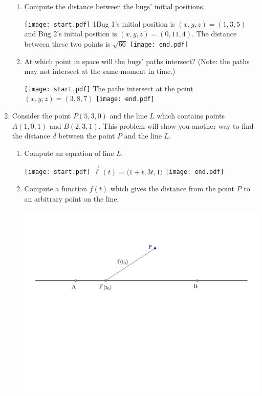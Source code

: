 \documentclass[12pt]{article}
\begin{document}
\begin{enumerate}
\begin{enumerate}

\item Compute the distance between the bugs' initial positions.

\texttt{[image: start.pdf]}
{{{1\linewidth}{Bug 1's initial position is $(x,y,z)=(1,3,5)$ and Bug 2's initial position is $(x,y,z)=(0,11,4)$.  The distance between these two points is $\sqrt{66}$}}}
\texttt{[image: end.pdf]}


\item At which point in space will the bugs' paths intersect?  (Note: the paths may not intersect at the same moment in time.)

\texttt{[image: start.pdf]}
{{The paths intersect at the point $(x,y,z)=(3,8,7)$}}
\texttt{[image: end.pdf]}


\end{enumerate}

\item Consider the point $P(5,3,0)$ and the line $L$ which contains points $A(1,0,1)$ and $B(2,3,1)$. This problem will show you another way to find the distance $d$ between the point $P$ and the line $L$.

\begin{enumerate}

\item Compute an equation of line $L$.

\texttt{[image: start.pdf]}
{{$\overrightarrow{\ell} (t) = \langle 1+t, 3t,1 \rangle$}}
\texttt{[image: end.pdf]}


\item Compute a function $f(t)$ which gives the distance from the point $P$ to an arbitrary point on the line.  

\begin{center}
\includegraphics[scale=0.5]{distance.pdf}
\end{center}


\end{enumerate}
\end{enumerate}
\end{document}
